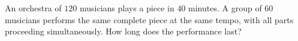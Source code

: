 An orchestra of $120$ musicians plays a piece in $40$ minutes. A group of $60$ musicians performs the same complete piece at the same tempo, with all parts proceeding simultaneously. How long does the performance last?
